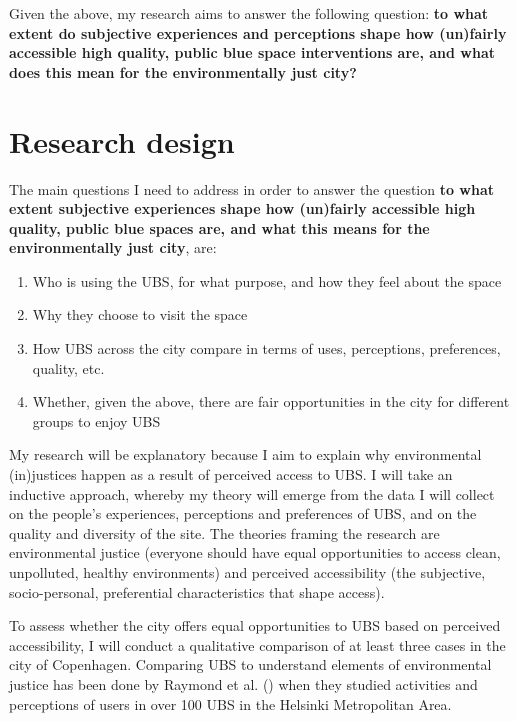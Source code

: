 \documentclass{article}
\begin{document}
Given the above, my research aims to answer the following question: \textbf{to what extent do subjective experiences and perceptions shape how (un)fairly accessible high quality, public blue space interventions are, and what does this mean for the environmentally just city?}

\section{Research design}

The main questions I need to address in order to answer the question \textbf{to what extent subjective experiences shape how (un)fairly accessible high quality, public blue spaces are, and what this means for the environmentally just city}, are:

\begin{enumerate}
	\item Who is using the UBS, for what purpose, and how they feel about the space
	\item Why they choose to visit the space
	\item How UBS across the city compare in terms of uses, perceptions, preferences, quality, etc.
	\item Whether, given the above, there are fair opportunities in the city for different groups to enjoy UBS
\end{enumerate}

My research will be explanatory because I aim to explain why environmental (in)justices happen as a result of perceived access to UBS. I will take an inductive approach, whereby my theory will emerge from the data I will collect on the people’s experiences, perceptions and preferences of UBS, and on the quality and diversity of the site. The theories framing the research are environmental justice (everyone should have equal opportunities to access clean, unpolluted, healthy environments) and perceived accessibility (the subjective, socio-personal, preferential characteristics that shape access).

To assess whether the city offers equal opportunities to UBS based on perceived accessibility, I will conduct a qualitative comparison of at least three cases in the city of Copenhagen. Comparing UBS to understand elements of environmental justice has been done by Raymond et al. (\citeyear{raymond2016integrating}) when they studied activities and perceptions of users in over 100 UBS in the Helsinki Metropolitan Area. 
\end{document}
